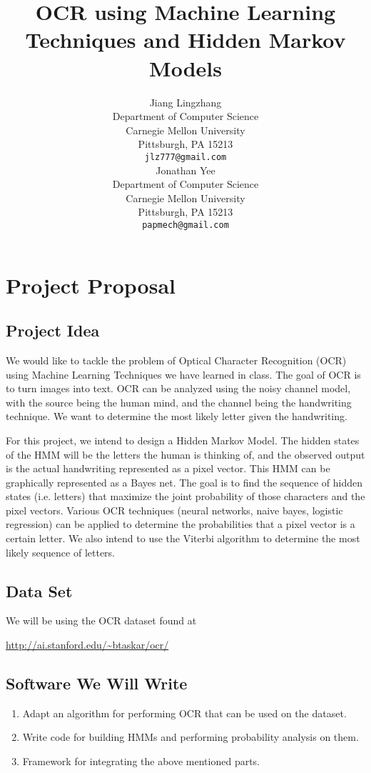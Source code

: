\documentclass{article} %
\title{OCR using Machine Learning Techniques and Hidden Markov Models}
\author{
Jiang Lingzhang \\
Department of Computer Science\\
Carnegie Mellon University\\
Pittsburgh, PA 15213 \\
\texttt{jlz777@gmail.com} \\
\And
Jonathan Yee \\
Department of Computer Science\\
Carnegie Mellon University\\
Pittsburgh, PA 15213 \\
\texttt{papmech@gmail.com} \\
}
\begin{document}
\maketitle

\section{Project Proposal}

\subsection{Project Idea}

We would like to tackle the problem of Optical Character Recognition (OCR) using Machine Learning Techniques we have learned in class. The goal of OCR is to turn images into text. OCR can be analyzed using the noisy channel model, with the source being the human mind, and the channel being the handwriting technique. We want to determine the most likely letter given the handwriting.

For this project, we intend to design a Hidden Markov Model. The hidden states of the HMM will be the letters the human is thinking of, and the observed output is the actual handwriting represented as a pixel vector. This HMM can be graphically represented as a Bayes net. The goal is to find the sequence of hidden states (i.e. letters) that maximize the joint probability of those characters and the pixel vectors. Various OCR techniques (neural networks, naive bayes, logistic regression) can be applied to determine the probabilities that a pixel vector is a certain letter. We also intend to use the Viterbi algorithm to determine the most likely sequence of letters.

\subsection{Data Set}

We will be using the OCR dataset found at
\begin{center}
   \url{http://ai.stanford.edu/~btaskar/ocr/}
\end{center}

\subsection{Software We Will Write}

\begin{enumerate}
	\item Adapt an algorithm for performing OCR that can be used on the dataset.
	\item Write code for building HMMs and performing probability analysis on them.
	\item Framework for integrating the above mentioned parts.
\end{enumerate}
\end{document}
